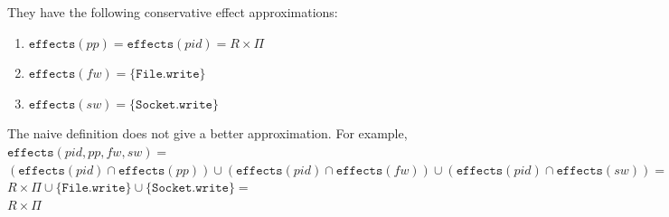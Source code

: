 \documentclass{llncs}
\newcommand{\keywadj}[1]{\mathtt{#1}}
\newcommand{\kwa}[1]{\keywadj{ #1 }}
\newcommand{\fx}[1]{ \kwa{effects}(#1) }
\begin{document}
\noindent
They have the following conservative effect approximations:

\begin{enumerate}
	\item $\fx{pp} = \fx{pid} = R \times \Pi$
	\item $\fx{fw} = \{\kwa{File.write}\}$
	\item $\fx{sw} = \{\kwa{Socket.write}\}$
\end{enumerate}

\noindent
The naive definition does not give a better approximation. For example,\\

\noindent
$\kwa{effects}(pid, {pp, fw, sw}) =$ \\
$(\fx{pid} \cap \fx{pp}) \cup (\fx{pid} \cap \fx{fw}) \cup (\fx{pid} \cap \fx{sw}) = $ \\
$R \times \Pi \cup \{\kwa{File.write}\} \cup \{\kwa{Socket.write}\} =$\\
$R \times \Pi$
\end{document}
